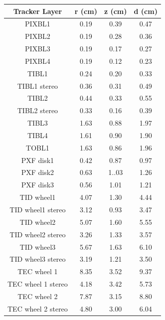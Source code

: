 \documentclass{cernatlasnote}
\begin{document}
\begin{appendices}
\begin{table}
    \centering
    \begin{tabular}{|c|c|c|c|}
    \hline
     Tracker Layer  &  r (cm) &  z (cm) &  d (cm)\\
     \hline
         PIXBL1 & 0.19  & 0.39  & 0.47 \\
         \hline
         PIXBL2 & 0.19 & 0.28 & 0.36\\
         \hline
         PIXBL3 & 0.19 & 0.17 & 0.27\\
         \hline
         PIXBL4 & 0.19 & 0.12 & 0.23\\
         \hline
         TIBL1 & 0.24 & 0.20 & 0.33 \\
         \hline
         TIBL1 stereo &0.36 & 0.31 & 0.49 \\
         \hline
         TIBL2 & 0.44  & 0.33 & 0.55 \\
         \hline
         TIBL2 stereo & 0.33 & 0.16 & 0.39 \\
         \hline
         TIBL3 & 1.63 & 0.88 & 1.97\\
         \hline
         TIBL4 &  1.61 & 0.90 & 1.90\\
         \hline
         TOBL1 & 1.63 & 0.86 & 1.96 \\
         \hline
         PXF disk1 & 0.42 & 0.87 & 0.97 \\
         \hline
         PXF disk2 & 0.63 & 1..03 & 1.26 \\
         \hline
         PXF disk3 & 0.56 & 1.01 & 1.21\\
         \hline
         TID wheel1 & 4.07 & 1.30 & 4.44\\
         \hline
         TID wheel1 stereo & 3.12 & 0.93 & 3.47\\
         \hline
         TID wheel2 & 5.07 & 1.60 & 5.55\\
         \hline
         TID wheel2 stereo & 3.26 & 1.33 & 3.57\\
         \hline
         TID wheel3 & 5.67 & 1.63 & 6.10 \\
         \hline
         TID wheel3 stereo & 3.19 & 1.21 & 3.50\\
         \hline
         TEC wheel 1 & 8.35 & 3.52 & 9.37\\
         \hline
         TEC wheel 1 stereo & 4.18 & 3.42 & 5.73\\
          \hline
         TEC wheel 2 & 7.87 & 3.15 & 8.80\\
          \hline
         TEC wheel 2 stereo & 4.80 & 3.00 & 6.04\\

\end{tabular}
\end{table}
\end{appendices}
\end{document}
